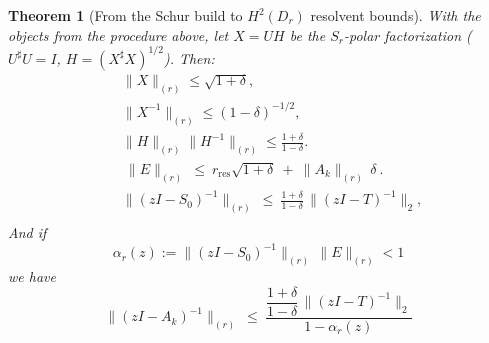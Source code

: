 \documentclass[11pt]{article}
\newtheorem{theorem}[definition]{Theorem}
\begin{document}
\begin{theorem}[From the Schur build to \(H^2(D_r)\) resolvent bounds]
\label{thm:schur-to-resolvent}
With the objects from the procedure above, let \(X=U H\) be the \(S_r\)-polar factorization
(\(U^\sharp U=I\), \(H=(X^\sharp X)^{1/2}\)). Then:
\begin{align*}
\quad&
\|X\|_{(r)}\le\sqrt{1+\delta},\\
\quad&
\|X^{-1}\|_{(r)}\le(1-\delta)^{-1/2},\\
\quad&
\|H\|_{(r)}\|H^{-1}\|_{(r)}\le\frac{1+\delta}{1-\delta}.\\
\quad&
 \ \|E\|_{(r)}\ \le\ r_{\mathrm{res}}\sqrt{1+\delta}\ +\ \|A_k\|_{(r)}\,\delta\ .\\
\quad&
\|(zI-S_0)^{-1}\|_{(r)}\ \le\ \frac{1+\delta}{1-\delta}\,\|(zI-T)^{-1}\|_2,\\
\end{align*}
And if 
\[
\alpha_r(z):=\|(zI-S_0)^{-1}\|_{(r)}\,\|E\|_{(r)}<1\
\] 
we have
\[
 \|(zI-A_k)^{-1}\|_{(r)}\ \le\
\frac{\dfrac{1+\delta}{1-\delta}\,\|(zI-T)^{-1}\|_2}{\,1-\alpha_r(z)\,}\ 
\]
\end{theorem}
\end{document}
